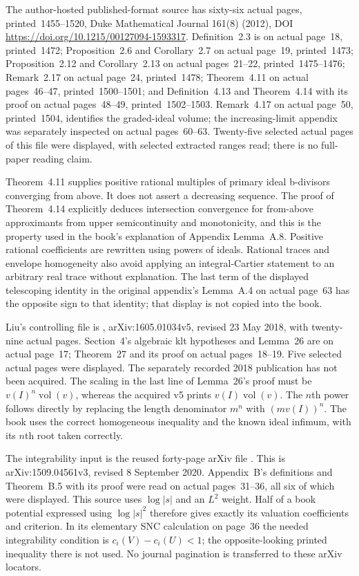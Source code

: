 The author-hosted published-format source
\cite{BdFF12PublishedAuthor} has sixty-six actual pages,
printed~1455--1520, Duke Mathematical Journal 161(8) (2012),
DOI \url{https://doi.org/10.1215/00127094-1593317}.
Definition~2.3 is on actual
page~18, printed~1472; Proposition~2.6 and Corollary~2.7 on
actual page~19, printed~1473; Proposition~2.12 and
Corollary~2.13 on actual pages~21--22, printed~1475--1476;
Remark~2.17 on actual page~24, printed~1478;
Theorem~4.11 on actual pages~46--47, printed~1500--1501;
and Definition~4.13 and Theorem~4.14 with its proof on actual
pages~48--49, printed~1502--1503. Remark~4.17 on actual
page~50, printed~1504, identifies the graded-ideal volume;
the increasing-limit appendix was separately inspected on
actual pages~60--63. Twenty-five selected actual pages of this
file were displayed, with selected extracted ranges read;
there is no full-paper reading claim.

Theorem~4.11 supplies positive rational multiples of primary
ideal b-divisors converging from above. It does not assert a
decreasing sequence. The proof of Theorem~4.14 explicitly
deduces intersection convergence for from-above approximants
from upper semicontinuity and monotonicity, and this is the
property used in the book's explanation of Appendix Lemma~A.8.
Positive rational coefficients are rewritten using powers of
ideals. Rational traces and envelope homogeneity also avoid
applying an integral-Cartier statement to an arbitrary real
trace without explanation. The last term of the displayed
telescoping identity in the original appendix's Lemma~A.4
on actual page~63 has the opposite sign to that identity;
that display is not copied into the book.

Liu's controlling file is \cite{Liu18VolumeV5},
arXiv:1605.01034v5, revised 23 May 2018, with twenty-nine
actual pages. Section~4's algebraic klt hypotheses and
Lemma~26 are on actual page~17; Theorem~27 and its proof on
actual pages~18--19. Five selected actual pages were displayed.
The separately recorded 2018 publication has not been acquired.
The scaling in the last line of Lemma~26's proof must be
$v(I)^n\operatorname{vol}(v)$, whereas the acquired v5 prints
$v(I)\operatorname{vol}(v)$. The $n$th power follows directly
by replacing the length denominator $m^n$ with $(mv(I))^n$.
The book uses the correct homogeneous inequality and the
known ideal infimum, with its $n$th root taken correctly.

The integrability input is the reused forty-page arXiv file
\cite{BBJ20IntegrabilityV3}. This is arXiv:1509.04561v3,
revised 8 September 2020. Appendix~B's definitions and
Theorem~B.5 with its proof were read on actual pages~31--36,
all six of which were displayed. This source uses
$\log|s|$ and an $L^2$ weight. Half of a book potential
expressed using $\log|s|^2$ therefore gives exactly its
valuation coefficients and criterion. In its elementary
SNC calculation on page~36 the needed integrability condition
is $c_i(V)-c_i(U)<1$; the opposite-looking printed inequality
there is not used. No journal pagination is transferred to
these arXiv locators.

